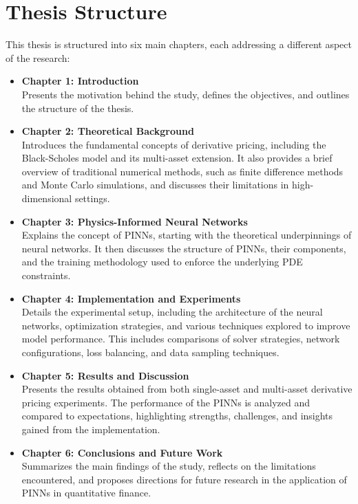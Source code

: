 \documentclass[12pt]{report} %
\theoremstyle{plain}           %
\theoremstyle{definition}      %
\theoremstyle{remark}          %
\begin{document}
\section{Thesis Structure}
This thesis is structured into six main chapters, each addressing a different aspect of the research:
\begin{itemize}
    \item \textbf{Chapter 1: Introduction} \\
    Presents the motivation behind the study, defines the objectives, and outlines the structure of the 
	thesis.
    
    \item \textbf{Chapter 2: Theoretical Background} \\
    Introduces the fundamental concepts of derivative pricing, including the Black-Scholes model and 
	its multi-asset extension. It also provides a brief overview of traditional numerical methods, such 
	as finite difference methods and Monte Carlo simulations, and discusses their limitations in 
	high-dimensional settings.
    
    \item \textbf{Chapter 3: Physics-Informed Neural Networks} \\
    Explains the concept of PINNs, starting with the theoretical underpinnings of neural networks. It 
	then discusses the structure of PINNs, their components, and the training methodology used to enforce 
	the underlying PDE constraints.
    
    \item \textbf{Chapter 4: Implementation and Experiments} \\
    Details the experimental setup, including the architecture of the neural networks, optimization 
	strategies, and various techniques explored to improve model performance. This includes comparisons 
	of solver strategies, network configurations, loss balancing, and data sampling techniques.
    
    \item \textbf{Chapter 5: Results and Discussion} \\
    Presents the results obtained from both single-asset and multi-asset derivative pricing experiments. 
	The performance of the PINNs is analyzed and compared to expectations, highlighting strengths, 
	challenges, and insights gained from the implementation.
    
    \item \textbf{Chapter 6: Conclusions and Future Work} \\
    Summarizes the main findings of the study, reflects on the limitations encountered, and proposes 
	directions for future research in the application of PINNs in quantitative finance.
\end{itemize}
\end{document}
